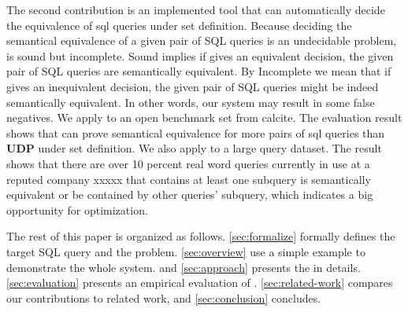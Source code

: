 The second contribution is an implemented tool \sys that can automatically decide the equivalence of sql queries under set definition.
%
Because deciding the semantical equivalence of a given pair of SQL queries is an undecidable problem, \sys is sound but incomplete.
%
Sound implies if \sys gives an equivalent decision, the given pair of SQL queries are semantically equivalent.
%
By Incomplete we mean that if \sys gives an inequivalent decision, the given pair of SQL queries might be indeed semantically equivalent. In other words, our system \sys may result in some false negatives.
%
We apply \sys to an open benchmark set from calcite.
%
The evaluation result shows that \sys can prove semantical equivalence for more pairs of sql queries than \textbf{UDP} under set definition.
%
We also apply \sys to a large query dataset.
%
The result shows that there are over 10 percent real word queries currently in use at a reputed company xxxxx that contains at least one subquery is semantically equivalent or be contained by other queries'
subquery, which indicates a big opportunity for optimization.

The rest of this paper is organized as follows.
\autoref{sec:formalize} formally defines the target SQL query and the problem.
%
\autoref{sec:overview} use a simple example to demonstrate the whole system.
%
and \autoref{sec:approach} presents the \sys in details.
%
\autoref{sec:evaluation} presents an empirical evaluation of \sys.
%
\autoref{sec:related-work} compares our contributions to related work,
and
%
\autoref{sec:conclusion} concludes.
